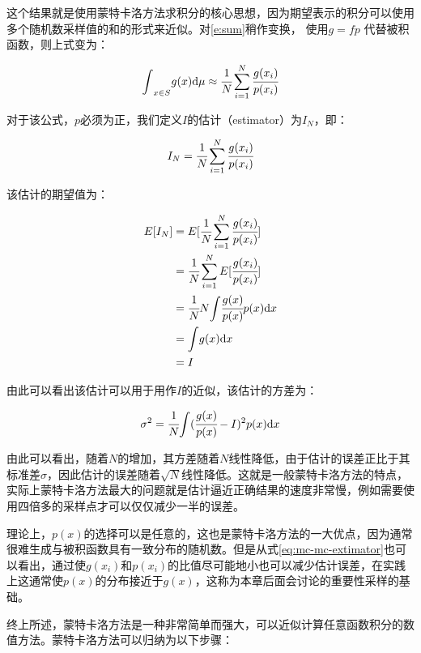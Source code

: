 这个结果就是使用蒙特卡洛方法求积分的核心思想，因为期望表示的积分可以使用多个随机数采样值的和的形式来近似。对\ref{e:sum}稍作变换， 使用$g=fp$ 代替被积函数，则上式变为：

\begin{equation}
	{\rm \int}_{x\in S}g(x){\rm d}\mu\approx \cfrac{1}{N}\sum_{i=1}^{N} \cfrac{g(x_i)}{p(x_i)}
\end{equation}

\noindent 对于该公式，$p$必须为正，我们定义$I$的估计（estimator）为$I_N$，即：

\begin{equation}\label{eq:mc-mc-extimator}
	I_N= \cfrac{1}{N}\sum_{i=1}^{N} \cfrac{g(x_i)}{p(x_i)}
\end{equation}

\noindent 该估计的期望值为：

\begin{equation}
	\begin{aligned}
		E[I_N]&=E[ \cfrac{1}{N}\sum_{i=1}^{N} \cfrac{g(x_i)}{p(x_i)}]\\
		&= \cfrac{1}{N}\sum_{i=1}^{N}E[ \cfrac{g(x_i)}{p(x_i)}]\\
		&= \cfrac{1}{N}N{\rm \int}  \cfrac{g(x)}{p(x)}p(x){\rm d}x\\
		&={\rm \int} g(x){\rm d}x\\
		&=I
	\end{aligned}
\end{equation}

\noindent 由此可以看出该估计可以用于用作$I$的近似，该估计的方差为：

\begin{equation}\label{e:variance}
	\sigma^2= \cfrac{1}{N}{\rm \int}( \cfrac{g(x)}{p(x)}-I)^2p(x){\rm d}x
\end{equation}

由此可以看出，随着$N$的增加，其方差随着$N$线性降低，由于估计的误差正比于其标准差$\sigma$，因此估计的误差随着$\sqrt{N}$线性降低。这就是一般蒙特卡洛方法的特点，实际上蒙特卡洛方法最大的问题就是估计逼近正确结果的速度非常慢，例如需要使用四倍多的采样点才可以仅仅减少一半的误差。 

理论上，$p(x)$的选择可以是任意的，这也是蒙特卡洛方法的一大优点，因为通常很难生成与被积函数具有一致分布的随机数。但是从式\ref{eq:mc-mc-extimator}也可以看出，通过使$g(x_i)$和$p(x_i)$的比值尽可能地小也可以减少估计误差，在实践上这通常使$p(x)$的分布接近于$g(x)$，这称为本章后面会讨论的重要性采样的基础。

终上所述，蒙特卡洛方法是一种非常简单而强大，可以近似计算任意函数积分的数值方法。蒙特卡洛方法可以归纳为以下步骤：


